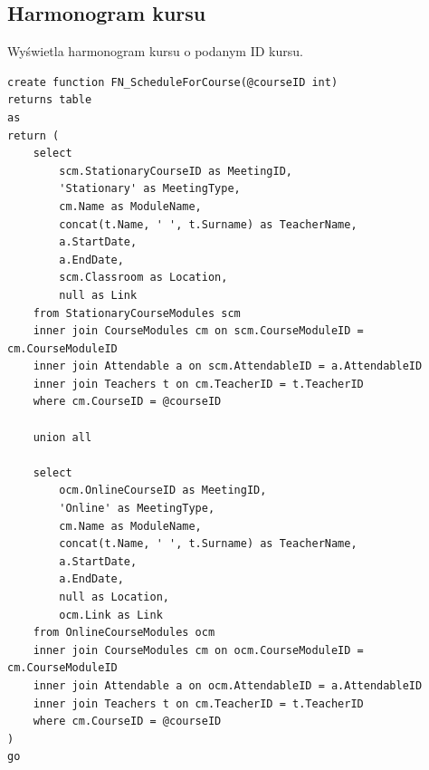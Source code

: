 \documentclass[11pt,a4paper]{article}
\begin{document}
\subsection{Harmonogram kursu}
Wyświetla harmonogram kursu o podanym ID kursu.
\begin{Verbatim}[breaklines=true]
create function FN_ScheduleForCourse(@courseID int)
returns table
as
return (
    select
        scm.StationaryCourseID as MeetingID,
        'Stationary' as MeetingType,
        cm.Name as ModuleName,
        concat(t.Name, ' ', t.Surname) as TeacherName,
        a.StartDate,
        a.EndDate,
        scm.Classroom as Location,
        null as Link
    from StationaryCourseModules scm
    inner join CourseModules cm on scm.CourseModuleID = cm.CourseModuleID
    inner join Attendable a on scm.AttendableID = a.AttendableID
    inner join Teachers t on cm.TeacherID = t.TeacherID
    where cm.CourseID = @courseID

    union all

    select
        ocm.OnlineCourseID as MeetingID,
        'Online' as MeetingType,
        cm.Name as ModuleName,
        concat(t.Name, ' ', t.Surname) as TeacherName,
        a.StartDate,
        a.EndDate,
        null as Location,
        ocm.Link as Link
    from OnlineCourseModules ocm
    inner join CourseModules cm on ocm.CourseModuleID = cm.CourseModuleID
    inner join Attendable a on ocm.AttendableID = a.AttendableID
    inner join Teachers t on cm.TeacherID = t.TeacherID
    where cm.CourseID = @courseID
)
go
\end{Verbatim}
\end{document}
